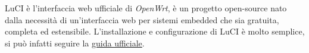 LuCI è l'interfaccia web ufficiale di \textit{OpenWrt}, è un progetto open-source nato dalla necessità di un'interfaccia web per sistemi embedded che sia gratuita, completa ed estensibile. L'installazione e configurazione di LuCI è molto semplice, si può infatti seguire la \href{https://openwrt.org/docs/guide-user/luci/luci.essentials}{guida ufficiale}.


